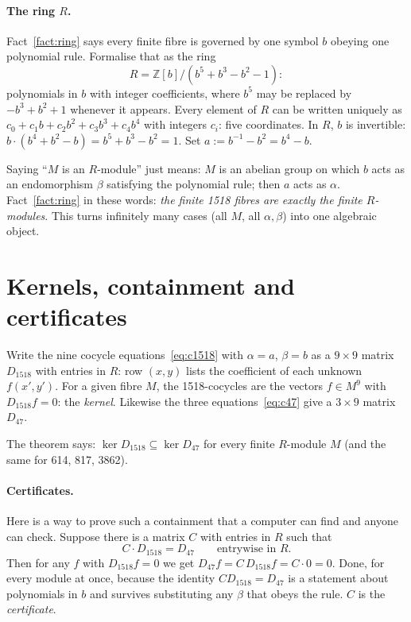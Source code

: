 \documentclass[11pt]{article}
\theoremstyle{definition}\newtheorem{example}{Example}\newtheorem{exercise}{Exercise}
\theoremstyle{remark}\newtheorem*{remark}{Remark}
\newcommand{\Z}{\mathbb{Z}}
\begin{document}
\paragraph{The ring $R$.} Fact~\ref{fact:ring} says every finite fibre is governed by one symbol $b$ obeying one polynomial rule. Formalise that as the ring
\[
R = \Z[b]\big/(b^5+b^3-b^2-1):
\]
polynomials in $b$ with integer coefficients, where $b^5$ may be replaced by $-b^3+b^2+1$ whenever it appears. Every element of $R$ can be written uniquely as $c_0+c_1b+c_2b^2+c_3b^3+c_4b^4$ with integers $c_i$: five coordinates. In $R$, $b$ is invertible: $b\cdot(b^4+b^2-b)=b^5+b^3-b^2=1$. Set $a:=b^{-1}-b^2 = b^4-b$.

Saying ``$M$ is an $R$-module'' just means: $M$ is an abelian group on which $b$ acts as an endomorphism $\beta$ satisfying the polynomial rule; then $a$ acts as $\alpha$. Fact~\ref{fact:ring} in these words: \emph{the finite 1518 fibres are exactly the finite $R$-modules}. This turns infinitely many cases (all $M$, all $\alpha,\beta$) into one algebraic object.

\section{Kernels, containment and certificates}\label{sec:linalg}

Write the nine cocycle equations~\eqref{eq:c1518} with $\alpha=a$, $\beta=b$ as a $9\times 9$ matrix $D_{1518}$ with entries in $R$: row $(x,y)$ lists the coefficient of each unknown $f(x',y')$. For a given fibre $M$, the 1518-cocycles are the vectors $f\in M^9$ with $D_{1518}f=0$: the \emph{kernel}. Likewise the three equations~\eqref{eq:c47} give a $3\times9$ matrix $D_{47}$.

The theorem says: $\ker D_{1518}\subseteq\ker D_{47}$ for every finite $R$-module $M$ (and the same for 614, 817, 3862).

\paragraph{Certificates.} Here is a way to prove such a containment that a computer can find and anyone can check. Suppose there is a matrix $C$ with entries in $R$ such that
\[
C\cdot D_{1518} = D_{47}\qquad\text{entrywise in } R.
\]
Then for any $f$ with $D_{1518}f=0$ we get $D_{47}f = C\,D_{1518}f = C\cdot 0 = 0$. Done, for every module at once, because the identity $C D_{1518}=D_{47}$ is a statement about polynomials in $b$ and survives substituting any $\beta$ that obeys the rule. $C$ is the \emph{certificate}.
\end{document}
